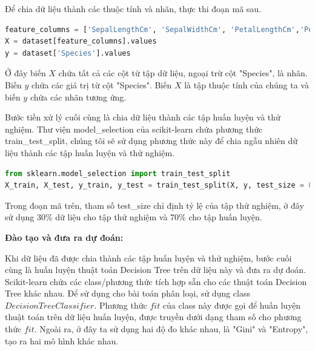Để chia dữ liệu thành các thuộc tính và nhãn, thực thi đoạn mã sau.

\begin{center}
\begin{lstlisting}[language=Python,breaklines=true]
feature_columns = ['SepalLengthCm', 'SepalWidthCm', 'PetalLengthCm','PetalWidthCm']
X = dataset[feature_columns].values
y = dataset['Species'].values
\end{lstlisting}
\end{center}

Ở đây biến $X$ chứa tất cả các cột từ tập dữ liệu, ngoại trừ cột "Species",
là nhãn. Biến $y$ chứa các giá trị từ cột "Species". Biến $X$ là tập thuộc tính
của chúng ta và biến $y$ chứa các nhãn tương ứng.

Bước tiền xử lý cuối cùng là chia dữ liệu thành các tập huấn luyện và thử nghiệm.
Thư viện model\_selection của scikit-learn chứa phương thức train\_test\_split,
chúng tôi sẽ sử dụng phương thức này để chia ngẫu nhiên dữ liệu thành
các tập huấn luyện và thử nghiệm.

\begin{center}
\begin{lstlisting}[language=Python,breaklines=true]
from sklearn.model_selection import train_test_split
X_train, X_test, y_train, y_test = train_test_split(X, y, test_size = 0.3, random_state = 0)
\end{lstlisting}
\end{center}

Trong đoạn mã trên, tham số test\_size chỉ định tỷ lệ của tập thử nghiệm,
ở đây sử dụng 30\% dữ liệu cho tập thử nghiệm và 70\% cho tập huấn luyện.

\textbf{Đào tạo và đưa ra dự đoán:}

Khi dữ liệu đã được chia thành các tập huấn luyện và thử nghiệm,
bước cuối cùng là huấn luyện thuật toán Decision Tree trên dữ liệu này và
đưa ra dự đoán. Scikit-learn chứa các class/phương thức tích hợp sẵn
cho các thuật toán Decision Tree khác nhau.
Để sử dụng cho bài toán phân loại, sử dụng class $DecisionTreeClassifier$.
Phương thức $fit$ của class này được gọi để huấn luyện thuật toán
trên dữ liệu huấn luyện, được truyền dưới dạng tham số cho phương thức $fit$.
Ngoài ra, ở đây ta sử dụng hai độ đo khác nhau, là "Gini" và "Entropy",
tạo ra hai mô hình khác nhau.

